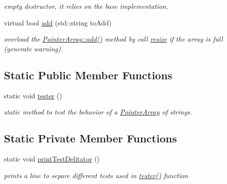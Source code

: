 \begin{DoxyCompactItemize}
\begin{DoxyCompactList}\small\item\em empty destructor, it relies on the base implementation. \end{DoxyCompactList}\item 
\hypertarget{classparray_1_1StringPointerArray_a5b79fa79d5aa75cd4572e7b87f6da25f}{virtual bool \hyperlink{classparray_1_1StringPointerArray_a5b79fa79d5aa75cd4572e7b87f6da25f}{add} (std\-::string to\-Add)}\label{classparray_1_1StringPointerArray_a5b79fa79d5aa75cd4572e7b87f6da25f}

\begin{DoxyCompactList}\small\item\em overload the \hyperlink{classparray_1_1PointerArray_ae080aeced3af072006e4a609fdadb838}{Pointer\-Array\-::add()} method by call \hyperlink{classparray_1_1PointerArray_a6d4347a899d2783d23775957ad71f743}{resize} if the array is full (generate warning). \end{DoxyCompactList}\end{DoxyCompactItemize}
\subsection*{Static Public Member Functions}
\begin{DoxyCompactItemize}
\item 
static void \hyperlink{classparray_1_1StringPointerArray_abfac13570bec8c88311714d19ddea59b}{tester} ()
\begin{DoxyCompactList}\small\item\em static method to test the behavior of a \hyperlink{classparray_1_1PointerArray}{Pointer\-Array} of strings. \end{DoxyCompactList}\end{DoxyCompactItemize}
\subsection*{Static Private Member Functions}
\begin{DoxyCompactItemize}
\item 
\hypertarget{classparray_1_1StringPointerArray_a17703cd98a2019970fccba1bc7e51c8e}{static void \hyperlink{classparray_1_1StringPointerArray_a17703cd98a2019970fccba1bc7e51c8e}{print\-Test\-Delitator} ()}\label{classparray_1_1StringPointerArray_a17703cd98a2019970fccba1bc7e51c8e}

\begin{DoxyCompactList}\small\item\em prints a line to separe different tests used in \hyperlink{classparray_1_1StringPointerArray_abfac13570bec8c88311714d19ddea59b}{tester()} function \end{DoxyCompactList}\end{DoxyCompactItemize}



